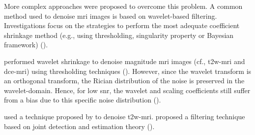 \begin{enumerate}[leftmargin=*]
More complex approaches were proposed to overcome this problem. A common method used to denoise \ac{mri} images is based on wavelet-based filtering. %
Investigations focus on the strategies to perform the most adequate coefficient shrinkage method (e.g., using thresholding, singularity property or Bayesian framework) (\cite{Pizurica2002}).

\cite{Ampeliotis2007,Ampeliotis2008} performed wavelet shrinkage to denoise magnitude \ac{mri} images (cf., \ac{t2w}-\ac{mri} and \ac{dce}-\ac{mri}) using thresholding techniques (\cite{Mallat2008}). However, since the wavelet transform is an orthogonal transform, the Rician distribution of the noise is preserved in the wavelet-domain. Hence, for low \ac{snr}, the wavelet and scaling coefficients still suffer from a bias due to this specific noise distribution (\cite{Nowak1999}). 

\cite{Lopes2011} used a technique proposed by \cite{Pizurica2003} to denoise \ac{t2w}-\ac{mri}. \cite{Pizurica2003} proposed a filtering technique based on joint detection and estimation theory (\cite{Middleton1968}).%


\end{enumerate}
